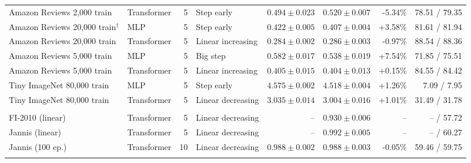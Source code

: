 \begin{table}[t]
\begin{tabular}{@{}llrlrrrr@{}}
Amazon Reviews 2,000 train & Transformer & 5 & Step early & \(0.494\pm0.023\) & \(0.520\pm0.007\) & -5.34\% & 78.51 / 79.35 \\
Amazon Reviews 20,000 train$^{\dagger}$ & MLP & 5 & Step early & \(0.422\pm0.005\) & \(0.407\pm0.004\) & +3.58\% & 81.61 / 81.94 \\
Amazon Reviews 20,000 train & Transformer & 5 & Linear increasing & \(0.284\pm0.002\) & \(0.286\pm0.003\) & -0.97\% & 88.54 / 88.36 \\
Amazon Reviews 5,000 train & MLP & 5 & Big step & \(0.582\pm0.017\) & \(0.538\pm0.019\) & +7.54\% & 71.85 / 75.51 \\
Amazon Reviews 5,000 train & Transformer & 5 & Linear increasing & \(0.405\pm0.015\) & \(0.404\pm0.013\) & +0.15\% & 84.55 / 84.42 \\
Tiny ImageNet 80,000 train & MLP & 5 & Step early & \(4.575\pm0.002\) & \(4.518\pm0.004\) & +1.26\% & 7.09 / 7.95 \\
Tiny ImageNet 80,000 train & Transformer & 5 & Linear decreasing & \(3.035\pm0.014\) & \(3.004\pm0.016\) & +1.01\% & 31.49 / 31.78 \\
\addlinespace[3pt]
\multicolumn{8}{l}{\textit{Architecture and duration follow-ups}} \\
FI-2010 (linear) & Transformer & 5 & Linear decreasing & -- & \(0.930\pm0.006\) & -- & -- / 57.72 \\
Jannis (linear) & Transformer & 5 & Linear decreasing & -- & \(0.992\pm0.005\) & -- & -- / 60.27 \\
Jannis (100 ep.) & Transformer & 10 & Linear decreasing & \(0.988\pm0.002\) & \(0.988\pm0.003\) & -0.05\% & 59.46 / 59.75 \\
\addlinespace[3pt]
\bottomrule
\end{tabular}
\end{table}
